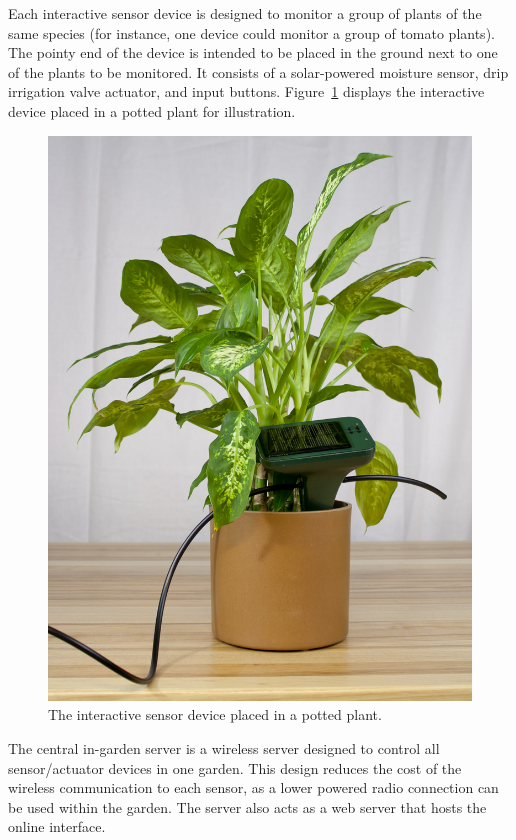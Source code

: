 \documentclass[11pt]{article}
\begin{document}
Each interactive sensor device is designed to monitor a group of plants of the same species (for instance, one device could monitor a group of tomato plants). The pointy end of the device is intended to be placed in the ground next to one of the plants to be monitored. It consists of a solar-powered moisture sensor, drip irrigation valve actuator, and input buttons. Figure~\ref{fig:plant_vertical} displays the interactive device placed in a potted plant for illustration.

\begin{figure}[h]
\begin{center}
\includegraphics[scale=0.15]{./pngs/plant_vertical.jpg}
\end{center}
\caption{The interactive sensor device placed in a potted plant.}
\label{fig:plant_vertical}
\end{figure}

The central in-garden server is a wireless server designed to control all sensor/actuator devices in one garden. This design reduces the cost of the wireless communication to each sensor, as a lower powered radio connection can be used within the garden. The server also acts as a web server that hosts the online interface.
\end{document}
